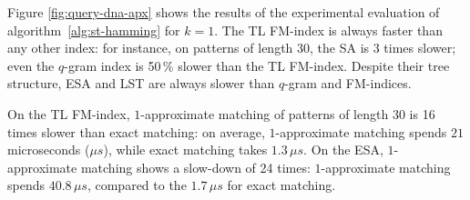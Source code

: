 
%

Figure \ref{fig:query-dna-apx} shows the results of the experimental evaluation of algorithm~\ref{alg:st-hamming} for $k=1$.
The TL FM-index is always faster than any other index: for instance, on patterns of length 30, the SA is 3 times slower; even the $q$-gram index is 50\,\% slower than the TL FM-index.
Despite their tree structure, ESA and LST are always slower than $q$-gram and FM-indices.

On the TL FM-index, $1$-approximate matching of patterns of length 30 is 16 times slower than exact matching: on average, $1$-approximate matching spends $21$ microseconds ($\mu s$), while exact matching takes $1.3 \, \mu s$.
On the ESA, $1$-approximate matching shows a slow-down of 24 times: $1$-approximate matching spends $40.8 \, \mu s$, compared to the $1.7 \, \mu s$ for exact matching.


